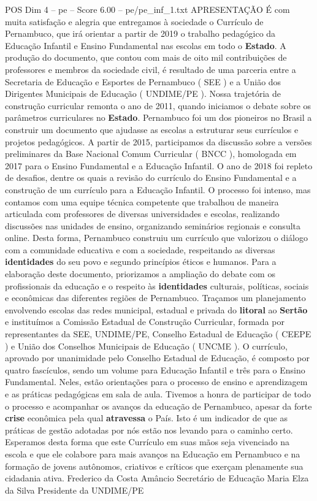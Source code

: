 \begin{textsample}{POS Dim 4 – pe – Score 6.00 – pe/pe\_inf\_1.txt}  \label{ex:f4_pos_277}
APRESENTAÇÃO É com muita satisfação e alegria que entregamos à sociedade o Currículo de Pernambuco, que irá orientar a partir de 2019 o trabalho pedagógico da Educação Infantil e Ensino Fundamental nas escolas em todo o \textbf{Estado}.
A produção do documento, que contou com mais de oito mil contribuições de professores e membros da sociedade civil, é resultado de uma parceria entre a Secretaria de Educação e Esportes de Pernambuco ( SEE ) e a União dos Dirigentes Municipais de Educação ( UNDIME/PE ).
Nossa trajetória de construção curricular remonta o ano de 2011, quando iniciamos o debate sobre os parâmetros curriculares no \textbf{Estado}.
Pernambuco foi um dos pioneiros no Brasil a construir um documento que ajudasse as escolas a estruturar seus currículos e projetos pedagógicos.
A partir de 2015, participamos da discussão sobre a versões preliminares da Base Nacional Comum Curricular ( BNCC ), homologada em 2017 para o Ensino Fundamental e a Educação Infantil.
O ano de 2018 foi repleto de desafios, dentre os quais a revisão do currículo do Ensino Fundamental e a construção de um currículo para a Educação Infantil.
O processo foi intenso, mas contamos com uma equipe técnica competente que trabalhou de maneira articulada com professores de diversas universidades e escolas, realizando discussões nas unidades de ensino, organizando seminários regionais e consulta online.
Desta forma, Pernambuco construiu um currículo que valorizou o diálogo com a comunidade educativa e com a sociedade, respeitando as diversas \textbf{identidades} do seu povo e segundo princípios éticos e humanos.
Para a elaboração deste documento, priorizamos a ampliação do debate com os profissionais da educação e o respeito às \textbf{identidades} culturais, políticas, sociais e econômicas das diferentes regiões de Pernambuco.
Traçamos um planejamento envolvendo escolas das redes municipal, estadual e privada do \textbf{litoral} ao \textbf{Sertão} e instituímos a Comissão Estadual de Construção Curricular, formada por representantes da SEE, UNDIME/PE, Conselho Estadual de Educação ( CEEPE ) e União dos Conselhos Municipais de Educação ( UNCME ).
O currículo, aprovado por unanimidade pelo Conselho Estadual de Educação, é composto por quatro fascículos, sendo um volume para Educação Infantil e três para o Ensino Fundamental.
Neles, estão orientações para o processo de ensino e aprendizagem e as práticas pedagógicas em sala de aula.
Tivemos a honra de participar de todo o processo e acompanhar os avanços da educação de Pernambuco, apesar da forte \textbf{crise} econômica pela qual \textbf{atravessa} o País.
Isto é um indicador de que as práticas de gestão adotadas por nós estão nos levando para o caminho certo.
Esperamos desta forma que este Currículo em suas mãos seja vivenciado na escola e que ele colabore para mais avanços na Educação em Pernambuco e na formação de jovens autônomos, criativos e críticos que exerçam plenamente sua cidadania ativa.
Frederico da Costa Amâncio Secretário de Educação Maria Elza da Silva Presidente da UNDIME/PE

\end{textsample}

